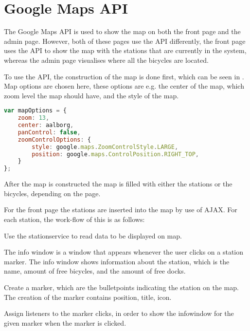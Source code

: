 \section{Google Maps API}\label{sec:googlemapsapi}
The Google Maps API \citep{misc:googlemapsapi} is used to show the map on both the front page and the admin page.
However, both of these pages use the API differently, the front page uses the API to show the map with the stations that are currently in the system, whereas the admin page visualises where all the bicycles are located.

To use the API, the construction of the map is done first, which can be seen in .
Map options are chosen here, these options are e.g. the center of the map, which zoom level the map should have, and the style of the map.

\begin{minipage}{\textwidth}
\begin{lstlisting}[caption={Construction of the map}, label={lst:mapoptions}, language=Javascript]
var mapOptions = {
	zoom: 13,
	center: aalborg,
	panControl: false,
    zoomControlOptions: {
		style: google.maps.ZoomControlStyle.LARGE,
		position: google.maps.ControlPosition.RIGHT_TOP,
	}
};
\end{lstlisting}
\end{minipage}

After the map is constructed the map is filled with either the stations or the bicycles, depending on the page.

For the front page the stations are inserted into the map by use of AJAX.
For each station, the work-flow of this is as follows:

\begin{description}[style=nextline]
	\item[Gather data]
	Use the stationservice to read data to be displayed on map.
	\item[Create info window]
	The info window is a window that appears whenever the user clicks on a station marker.
	The info window shows information about the station, which is the name, amount of free bicycles, and the amount of free docks.
	\item[Marker creation]
	Create a marker, which are the bulletpoints indicating the station on the map.
	The creation of the marker contains position, title, icon.
	\item[Assign listeners]
	Assign listeners to the marker clicks, in order to show the infowindow for the given marker when the marker is clicked.
\end{description}

